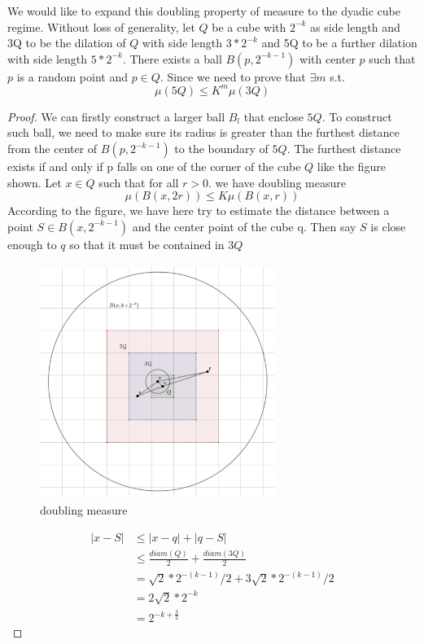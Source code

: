 \documentclass{article}
\begin{document}
We would like to expand this doubling property of measure to the dyadic cube regime. Without loss of generality, let $Q$ be a cube with $2^{-k}$ as side length and 3Q to be the dilation of $Q$ with side length $3*2^{-k}$ and 5Q to be a further dilation with side length $5*2^{-k}$. There exists a ball $B(p,2^{-k-1})$ with center $p$ such that $p$ is a random point and $p \in Q$. Since we need to prove that $\exists m$ s.t. \[\mu(5Q) \leq K^m \mu(3Q)\]
\begin{proof}
We can firstly construct a larger ball $B_l$ that enclose $5Q$. To construct such ball, we need to make sure its radius is greater than the furthest distance from the center of $B(p,2^{-k-1})$ to the boundary of $5Q$. The furthest distance exists if and only if p falls on one of the corner of the cube $Q$ like the figure shown. Let $x \in Q$ such that for all $r > 0$. we have doubling measure \[\mu(B(x,2r))\leq K\mu(B(x,r))\] According to the figure, we have here try to estimate the distance between a point $S\in B(x, 2^{-k-1})$ and the center point of the cube q. Then say $S$ is close enough to $q$ so that it must be contained in $3Q$ 
\begin{figure}
    \centering
    \includegraphics[width = 3in, height = 3in]{dm.png}
    \caption{doubling measure}
    \label{fig:my_label}
\end{figure}
\begin{equation*}
    \begin{aligned}
        |x - S| & \leq |x - q| + |q - S| \\
        & \leq \frac{diam(Q)}{2} + \frac{diam(3Q)}{2} \\
        & =\sqrt{2}*2^{-(k-1)}/2 + 3\sqrt{2}*2^{-(k-1)}/2 \\
        & =2\sqrt{2}*2^{-k} \\
        & =2^{-k + \frac{3}{2}}

\end{aligned}
\end{equation*}
\end{proof}
\end{document}
